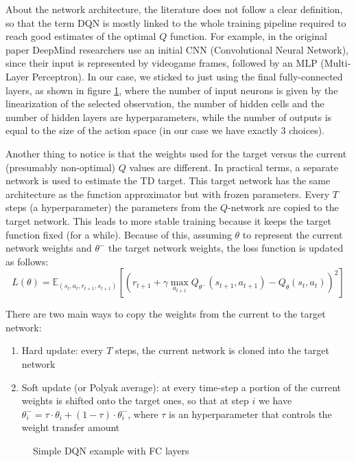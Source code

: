 \documentclass[a4paper,10pt]{report}
\begin{document}
About the network architecture, the literature does not follow a clear definition, so that the term DQN is mostly linked to the whole training pipeline required to reach good estimates of the optimal $Q$ function. For example, in the original paper \cite{atari-dqn} DeepMind researchers use an initial CNN (Convolutional Neural Network), since their input is represented by videogame frames, followed by an MLP (Multi-Layer Perceptron). In our case, we sticked to just using the final fully-connected layers, as shown in figure \ref{fig:fc-dqn}, where the number of input neurons is given by the linearization of the selected observation, the number of hidden cells and the number of hidden layers are hyperparameters, while the number of outputs is equal to the size of the action space (in our case we have exactly $3$ choices). 

Another thing to notice is that the weights used for the target versus the current (presumably non-optimal) $Q$ values are different. In practical terms, a separate network is used to estimate the TD target. This target network has the same architecture as the function approximator but with frozen parameters. Every $T$ steps (a hyperparameter) the parameters from the $Q$-network are copied to the target network. This leads to more stable training because it keeps the target function fixed (for a while). Because of this, assuming $\theta$ to represent the current network weights and $\theta^{-}$ the target network weights, the loss function is updated as follows:
$$
L(\theta)=\mathbb{E}_{(s_t,a_t,r_{t+1},s_{t+1})}\left[\left(r_{t+1}+\gamma\max_{a_{t+1}}Q_{\theta^{-}}(s_{t+1}, a_{t+1}) - Q_{\theta}(s_t, a_t)\right)^2\right]
$$

There are two main ways to copy the weights from the current to the target network:
\begin{enumerate}
	\item Hard update: every $T$ steps, the current network is cloned into the target network
	\item Soft update (or Polyak average): at every time-step a portion of the current weights is shifted onto the target ones, so that at step $i$ we have $\theta_i^{-}=\tau \cdot \theta_i + (1-\tau)\cdot \theta_i^{-}$, where $\tau$ is an hyperparameter that controls the weight transfer amount 
\end{enumerate}

\begin{figure}[h]
	\centering
	
	\caption{Simple DQN example with FC layers}
	\label{fig:fc-dqn}
\end{figure}
\end{document}
